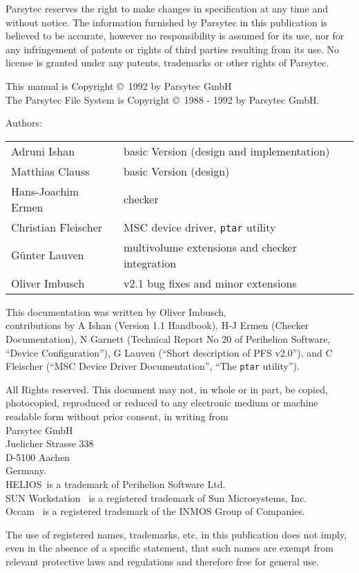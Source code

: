 Parsytec reserves the right to make changes in specification at any time and 
without notice. The information furnished by Parsytec in this publication is
believed to be accurate, however no responsibility is assumed for its use, nor
for any infringement of patents or rights of third parties resulting from its 
use. No license is granted under any patents, trademarks or other rights of
Parsytec.

\vfill

This manual is Copyright \copyright\ 1992 by Parsytec GmbH \\
The Parsytec File System is Copyright \copyright\ 1988 - 1992
by Parsytec GmbH.

Authors:\\
\begin{tabular}{ll}
  Adruni Ishan        & basic Version (design and implementation)      \\
  Matthias Clauss     & basic Version (design)                         \\   
  Hans-Joachim Ermen  & checker                                        \\ 
  Christian Fleischer & MSC device driver, {\tt ptar} utility          \\
  G\"unter Lauven     & multivolume extensions and checker integration \\
  Oliver Imbusch      & v2.1 bug fixes and minor extensions            \\
\end{tabular}

This documentation was written by Oliver Imbusch, \\
contributions by A Ishan (Version 1.1 Handbook), H-J Ermen (Checker
Documentation), N Garnett (Technical Report No 20 of Perihelion Software,
``Device Configuration''), G Lauven (``Short description of PFS v2.0''),
and C Fleischer (``MSC Device Driver Documentation'', ``The {\tt ptar} 
utility'').

All Rights reserved. This document may not, in whole or in part, be copied, 
photocopied, reproduced or reduced to any electronic medium or machine
readable form without prior consent, in writing from\\

Parsytec GmbH\\
Juelicher Strasse 338\\
D-5100 Aachen\\
Germany.\\

HELIOS\trademark\ is a trademark of Perihelion Software Ltd.\\
SUN Workstation \registered\ is a registered trademark of Sun Microsystems,
Inc.\\
Occam \registered\ is a registered trademark of the INMOS Group of Companies.

The use of registered names, trademarks, etc. in this publication does not
imply, even in the absence of a specific statement, that such names are exempt
from relevant protective laws and regulations and therefore free for general use.
